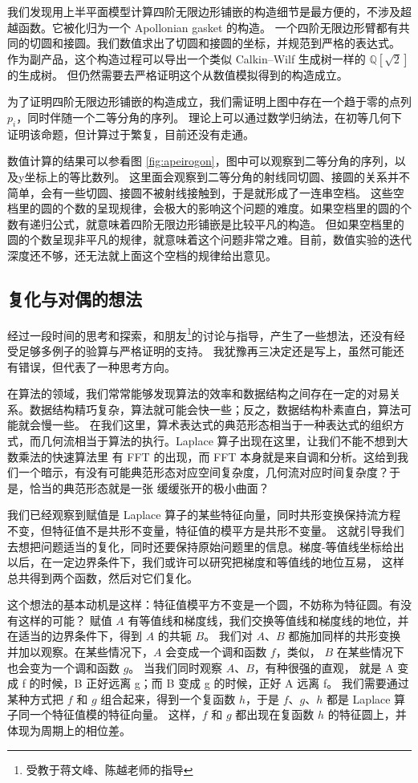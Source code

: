 \documentclass[a4paper,12pt]{article}
\numberwithin{problem}{section}
\numberwithin{definition}{section}
\numberwithin{lemma}{section}
\numberwithin{proposition}{section}
\numberwithin{theorem}{section}
\numberwithin{grammar}{section}
\numberwithin{program}{section}
\numberwithin{convention}{section}
\numberwithin{corollary}{section}
\begin{document}
我们发现用上半平面模型计算四阶无限边形铺嵌的构造细节是最方便的，不涉及超越函数。它被化归为一个 Apollonian gasket 的构造。
一个四阶无限边形臂都有共同的切圆和接圆。我们数值求出了切圆和接圆的坐标，并规范到严格的表达式。
作为副产品，这个构造过程可以导出一个类似 Calkin–Wilf 生成树一样的 $\mathbb{Q}[\sqrt{2}]$ 的生成树。
但仍然需要去严格证明这个从数值模拟得到的构造成立。

为了证明四阶无限边形铺嵌的构造成立，我们需证明上图中存在一个趋于零的点列$p_i$，同时伴随一个二等分角的序列。
理论上可以通过数学归纳法，在初等几何下证明该命题，但计算过于繁复，目前还没有走通。

数值计算的结果可以参看图 \ref{fig:apeirogon}，图中可以观察到二等分角的序列，以及y坐标上的等比数列。
这里面会观察到二等分角的射线同切圆、接圆的关系并不简单，会有一些切圆、接圆不被射线接触到，于是就形成了一连串空档。
这些空档里的圆的个数的呈现规律，会极大的影响这个问题的难度。如果空档里的圆的个数有递归公式，就意味着四阶无限边形铺嵌是比较平凡的构造。
但如果空档里的圆的个数呈现非平凡的规律，就意味着这个问题非常之难。目前，数值实验的迭代深度还不够，还无法就上面这个空档的规律给出意见。

\subsection{复化与对偶的想法}

经过一段时间的思考和探索，和朋友\footnote{受教于蒋文峰、陈越老师的指导}的讨论与指导，产生了一些想法，还没有经受足够多例子的验算与严格证明的支持。
我犹豫再三决定还是写上，虽然可能还有错误，但代表了一种思考方向。

在算法的领域，我们常常能够发现算法的效率和数据结构之间存在一定的对易关系。数据结构精巧复杂，算法就可能会快一些；反之，数据结构朴素直白，算法可能就会慢一些。
在我们这里，算术表达式的典范形态相当于一种表达式的组织方式，而几何流相当于算法的执行。Laplace 算子出现在这里，让我们不能不想到大数乘法的快速算法里
有 FFT 的出现，而 FFT 本身就是来自调和分析。这给到我们一个暗示，有没有可能典范形态对应空间复杂度，几何流对应时间复杂度？于是，恰当的典范形态就是一张
缓缓张开的极小曲面？

我们已经观察到赋值是 Laplace 算子的某些特征向量，同时共形变换保持流方程不变，但特征值不是共形不变量，特征值的模平方是共形不变量。
这就引导我们去想把问题适当的复化，同时还要保持原始问题里的信息。梯度-等值线坐标给出以后，在一定边界条件下，我们或许可以研究把梯度和等值线的地位互易，
这样总共得到两个函数，然后对它们复化。

这个想法的基本动机是这样：特征值模平方不变是一个圆，不妨称为特征圆。有没有这样的可能？
赋值 $A$ 有等值线和梯度线，我们交换等值线和梯度线的地位，并在适当的边界条件下，得到 $A$ 的共轭 $B$。
我们对 $A$、$B$ 都施加同样的共形变换并加以观察。在某些情况下，$A$ 会变成一个调和函数 $f$，类似， $B$ 在某些情况下也会变为一个调和函数 $g$。
当我们同时观察 $A$、$B$，有种很强的直观， 就是 A 变成 f 的时候，B 正好远离 g；而 B 变成 g 的时候，正好 A 远离 f。
我们需要通过某种方式把 $f$ 和 $g$ 组合起来，得到一个复函数 $h$，于是 $f$、$g$、$h$ 都是 Laplace 算子同一个特征值模的特征向量。
这样，$f$ 和 $g$ 都出现在复函数 $h$ 的特征圆上，并体现为周期上的相位差。
\end{document}
